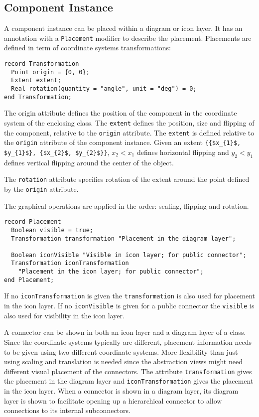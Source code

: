 \subsection{Component Instance}\label{component-instance}

A component instance can be placed within a diagram or icon layer.
It has an annotation with a \lstinline!Placement! modifier to describe the placement.
Placements are defined in term of coordinate systems transformations:
\begin{lstlisting}[language=modelica]
record Transformation
  Point origin = {0, 0};
  Extent extent;
  Real rotation(quantity = "angle", unit = "deg") = 0;
end Transformation;
\end{lstlisting}%
The origin attribute defines the position of the component in the coordinate system of the enclosing class.
The \lstinline!extent! defines the position, size and flipping of the component, relative to the \lstinline!origin! attribute.
The \lstinline!extent! is defined relative to the \lstinline!origin! attribute of the component instance.
Given an extent \lstinline!{{$x_{1}$, $y_{1}$}, {$x_{2}$, $y_{2}$}}!, $x_{2} < x_{1}$ defines horizontal flipping and $y_{2} < y_{1}$ defines vertical flipping around the center of the object.

The \lstinline!rotation! attribute specifies rotation of the extent around the point defined by the \lstinline!origin! attribute.

The graphical operations are applied in the order: scaling, flipping and rotation.

\begin{lstlisting}[language=modelica]
record Placement
  Boolean visible = true;
  Transformation transformation "Placement in the diagram layer";

  Boolean iconVisible "Visible in icon layer; for public connector";
  Transformation iconTransformation
    "Placement in the icon layer; for public connector";
end Placement;
\end{lstlisting}%
If no \lstinline!iconTransformation! is given the \lstinline!transformation! is also used for placement in the icon layer.
If no \lstinline!iconVisible! is given for a public connector the \lstinline!visible! is also used for visibility in the icon layer.

\begin{nonnormative}
A connector can be shown in both an icon layer and a diagram
layer of a class. Since the coordinate systems typically are different,
placement information needs to be given using two different coordinate
systems. More flexibility than just using scaling and translation is
needed since the abstraction views might need different visual placement
of the connectors. The attribute \lstinline!transformation! gives the placement in
the diagram layer and \lstinline!iconTransformation! gives the placement in the icon
layer. When a connector is shown in a diagram layer, its diagram layer
is shown to facilitate opening up a hierarchical connector to allow
connections to its internal subconnectors.
\end{nonnormative}

